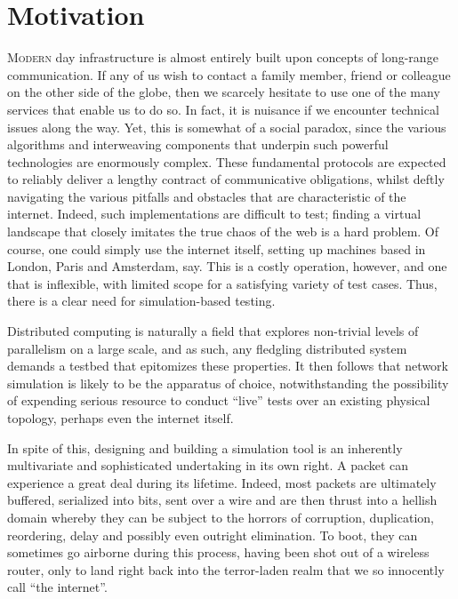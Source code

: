 \section{Motivation}\label{section:motivation}

\lettrine{M}{odern} day infrastructure is almost entirely built upon concepts of long-range communication. If any of
us wish to contact a family member, friend or colleague on the other side of the globe, then we scarcely hesitate to
use one of the many services that enable us to do so. In fact, it is nuisance if we encounter technical issues along
the way. Yet, this is somewhat of a social paradox, since the various algorithms and interweaving components
that underpin such powerful technologies are enormously complex. These fundamental protocols are expected to reliably
deliver a lengthy contract of communicative obligations, whilst deftly navigating the various pitfalls and obstacles
that are characteristic of the internet. Indeed, such implementations are difficult to test; finding a virtual
landscape that closely imitates the true chaos of the web is a hard problem. Of course, one could simply use the
internet itself, setting up machines based in London, Paris and Amsterdam, say. This is a costly operation, however,
and one that is inflexible, with limited scope for a satisfying variety of test cases. Thus, there is a clear need for
simulation-based testing.

Distributed computing is naturally a field that explores non-trivial levels of parallelism on a large
scale, and as such, any fledgling distributed system demands a testbed that epitomizes these properties. It then
follows that network simulation is likely to be the apparatus of choice, notwithstanding the possibility of expending
serious resource to conduct ``live'' tests over an existing physical topology, perhaps even the internet itself.

In spite of this, designing and building a simulation tool is an inherently multivariate and sophisticated undertaking
in its own right. A packet can experience a great deal during its lifetime. Indeed, most packets are ultimately
buffered, serialized into bits, sent over a wire and are then thrust into a hellish domain whereby they can be
subject to the horrors of corruption, duplication, reordering, delay and possibly even outright elimination. To boot,
they can sometimes go airborne during this process, having been shot out of a wireless router, only to land right
back into the terror-laden realm that we so innocently call ``the internet''.

